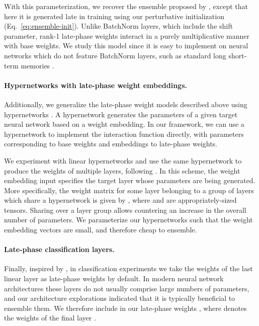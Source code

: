 \documentclass{article} \usepackage{iclr2021_conference,times}
\begin{document}
With this parameterization, we recover the ensemble proposed by \citet{wen_batchensemble_2020}, except that here it is generated late in training using our perturbative initialization (Eq.~\ref{eq:ensemble-init}). Unlike BatchNorm layers, which include the shift parameter, rank-1 late-phase weights interact in a purely multiplicative manner with base weights. We study this model since it is easy to implement on neural networks which do not feature BatchNorm layers, such as standard long short-term memories \citep[LSTMs;][]{hochreiter_long_1997}.

\paragraph{Hypernetworks with late-phase weight embeddings.} Additionally, we generalize the late-phase weight models described above using hypernetworks \citep[][]{ha_hypernetworks_2017}. A hypernetwork generates the parameters  of a given target neural network  based on a weight embedding. In our framework, we can use a hypernetwork to implement the interaction function  directly, with parameters  corresponding to base weights and embeddings  to late-phase weights.

We experiment with linear hypernetworks and use the same hypernetwork to produce the weights of multiple layers, following \citet{savarese_learning_2019,ha_hypernetworks_2017,von_oswald_continual_2020}. In this scheme, the weight embedding input specifies the target layer whose parameters are being generated.  More specifically, the weight matrix for some layer  belonging to a group of layers  which share a hypernetwork is given by , where  and  are appropriately-sized tensors. Sharing  over a layer group  allows countering an increase in the overall number of parameters. We parameterize our hypernetworks such that the weight embedding vectors   are small, and therefore cheap to ensemble.

\paragraph{Late-phase classification layers.} Finally, inspired by \citet{lee_why_2015}, in classification experiments we take the weights of the last linear layer as late-phase weights by default. In modern neural network architectures these layers do not usually comprise large numbers of parameters, and our architecture explorations indicated that it is typically beneficial to ensemble them. We therefore include  in our late-phase weights , where  denotes the weights of the final layer .
\end{document}

